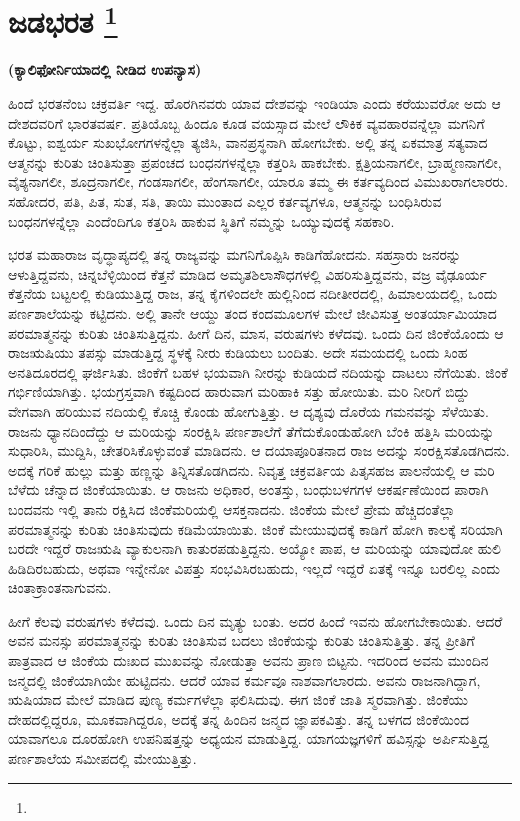 
\chapter[ಜಡಭರತ]{ಜಡಭರತ \protect\footnote{}}

\centerline{\textbf{(ಕ್ಯಾಲಿಫೋರ್ನಿಯಾದಲ್ಲಿ ನೀಡಿದ ಉಪನ್ಯಾಸ)}}

ಹಿಂದೆ ಭರತನೆಂಬ ಚಕ್ರವರ್ತಿ ಇದ್ದ. ಹೊರಗಿನವರು ಯಾವ ದೇಶವನ್ನು ಇಂಡಿಯಾ ಎಂದು ಕರೆಯುವರೋ ಅದು ಆ ದೇಶದವರಿಗೆ ಭಾರತವರ್ಷ. ಪ್ರತಿಯೊಬ್ಬ ಹಿಂದೂ ಕೂಡ ವಯಸ್ಸಾದ ಮೇಲೆ ಲೌಕಿಕ ವ್ಯವಹಾರವನ್ನೆಲ್ಲಾ ಮಗನಿಗೆ ಕೊಟ್ಟು, ಐಶ್ವರ್ಯ ಸುಖಭೋಗಗಳನ್ನೆಲ್ಲಾ ತ್ಯಜಿಸಿ, ವಾನಪ್ರಸ್ಥನಾಗಿ ಹೋಗಬೇಕು. ಅಲ್ಲಿ ತನ್ನ ಏಕಮಾತ್ರ ಸತ್ಯವಾದ ಆತ್ಮನನ್ನು ಕುರಿತು ಚಿಂತಿಸುತ್ತಾ ಪ್ರಪಂಚದ ಬಂಧನಗಳನ್ನೆಲ್ಲಾ ಕತ್ತರಿಸಿ ಹಾಕಬೇಕು. ಕ್ಷತ್ರಿಯನಾಗಲೀ, ಬ್ರಾಹ್ಮಣನಾಗಲೀ, ವೈಶ್ಯನಾಗಲೀ, ಶೂದ್ರನಾಗಲೀ, ಗಂಡಸಾಗಲೀ, ಹೆಂಗಸಾಗಲೀ, ಯಾರೂ ತಮ್ಮ ಈ ಕರ್ತವ್ಯದಿಂದ ವಿಮುಖರಾಗಲಾರರು. ಸಹೋದರ, ಪತಿ, ಪಿತ, ಸುತ, ಸತಿ, ತಾಯಿ ಮುಂತಾದ ಎಲ್ಲರ ಕರ್ತವ್ಯಗಳೂ, ಆತ್ಮನನ್ನು ಬಂಧಿಸಿರುವ ಬಂಧನಗಳನ್ನೆಲ್ಲಾ ಎಂದೆಂದಿಗೂ ಕತ್ತರಿಸಿ ಹಾಕುವ ಸ್ಥಿತಿಗೆ ನಮ್ಮನ್ನು ಒಯ್ಯುವುದಕ್ಕೆ ಸಹಕಾರಿ.

ಭರತ ಮಹಾರಾಜ ವೃದ್ಧಾಪ್ಯದಲ್ಲಿ ತನ್ನ ರಾಜ್ಯವನ್ನು ಮಗನಿಗೊಪ್ಪಿಸಿ ಕಾಡಿಗೆ\break ಹೋದನು. ಸಹಸ್ರಾರು ಜನರನ್ನು ಆಳುತ್ತಿದ್ದವನು, ಚಿನ್ನಬೆಳ್ಳಿಯಿಂದ ಕೆತ್ತನೆ ಮಾಡಿದ ಅಮೃತಶಿಲಾಸೌಧಗಳಲ್ಲಿ ವಿಹರಿಸುತ್ತಿದ್ದವನು, ವಜ್ರ ವೈಢೂರ್ಯ ಕೆತ್ತನೆಯ ಬಟ್ಟಲಲ್ಲಿ ಕುಡಿಯುತ್ತಿದ್ದ ರಾಜ, ತನ್ನ ಕೈಗಳಿಂದಲೇ ಹುಲ್ಲಿನಿಂದ ನದೀತೀರದಲ್ಲಿ, ಹಿಮಾಲಯದಲ್ಲಿ, ಒಂದು ಪರ್ಣಶಾಲೆಯನ್ನು ಕಟ್ಟಿದನು. ಅಲ್ಲಿ ತಾನೇ ಆಯ್ದು ತಂದ ಕಂದಮೂಲಗಳ ಮೇಲೆ ಜೀವಿಸುತ್ತ ಅಂತರ್ಯಾಮಿಯಾದ ಪರಮಾತ್ಮನನ್ನು ಕುರಿತು ಚಿಂತಿಸುತ್ತಿದ್ದನು. ಹೀಗೆ ದಿನ, ಮಾಸ, ವರುಷಗಳು ಕಳೆದವು. ಒಂದು ದಿನ ಜಿಂಕೆಯೊಂದು ಆ ರಾಜಋಷಿಯು ತಪಸ್ಸು ಮಾಡುತ್ತಿದ್ದ ಸ್ಥಳಕ್ಕೆ ನೀರು ಕುಡಿಯಲು ಬಂದಿತು. ಅದೇ ಸಮಯದಲ್ಲಿ ಒಂದು ಸಿಂಹ ಅನತಿದೂರದಲ್ಲಿ ಘರ್ಜಿಸಿತು. ಜಿಂಕೆಗೆ ಬಹಳ ಭಯವಾಗಿ ನೀರನ್ನು ಕುಡಿಯದೆ ನದಿಯನ್ನು ದಾಟಲು ನೆಗೆಯಿತು. ಜಿಂಕೆ ಗರ್ಭಿಣಿಯಾಗಿತ್ತು. ಭಯಗ್ರಸ್ತವಾಗಿ ಕಷ್ಟದಿಂದ ಹಾರುವಾಗ ಮರಿಹಾಕಿ ಸತ್ತು ಹೋಯಿತು. ಮರಿ ನೀರಿಗೆ ಬಿದ್ದು ವೇಗವಾಗಿ ಹರಿಯುವ ನದಿಯಲ್ಲಿ ಕೊಚ್ಚಿ ಕೊಂಡು ಹೋಗುತ್ತಿತ್ತು. ಆ ದೃಶ್ಯವು ದೊರೆಯ ಗಮನವನ್ನು ಸೆಳೆಯಿತು. ರಾಜನು ಧ್ಯಾನದಿಂದೆದ್ದು ಆ ಮರಿಯನ್ನು ಸಂರಕ್ಷಿಸಿ ಪರ್ಣಶಾಲೆಗೆ ತೆಗೆದುಕೊಂಡುಹೋಗಿ ಬೆಂಕಿ ಹತ್ತಿಸಿ ಮರಿಯನ್ನು ಸುಧಾರಿಸಿ, ಮುದ್ದಿಸಿ, ಚೇತರಿಸಿಕೊಳ್ಳುವಂತೆ ಮಾಡಿದನು. ಆ ದಯಾಪೂರಿತನಾದ ರಾಜ ಅದನ್ನು ಸಂರಕ್ಷಿಸತೊಡಗಿದನು. ಅದಕ್ಕೆ ಗರಿಕೆ ಹುಲ್ಲು ಮತ್ತು ಹಣ್ಣನ್ನು ತಿನ್ನಿಸತೊಡಗಿದನು. ನಿವೃತ್ತ ಚಕ್ರವರ್ತಿಯ ಪಿತೃಸಹಜ ಪಾಲನೆಯಲ್ಲಿ ಆ ಮರಿ ಬೆಳೆದು ಚೆನ್ನಾದ ಜಿಂಕೆಯಾಯಿತು. ಆ ರಾಜನು ಅಧಿಕಾರ, ಅಂತಸ್ತು, ಬಂಧುಬಳಗಗಳ ಆಕರ್ಷಣೆಯಿಂದ ಪಾರಾಗಿ ಬಂದವನು ಇಲ್ಲಿ ತಾನು ರಕ್ಷಿಸಿದ ಜಿಂಕೆಮರಿಯಲ್ಲಿ ಆಸಕ್ತನಾದನು. ಜಿಂಕೆಯ ಮೇಲೆ ಪ್ರೇಮ ಹೆಚ್ಚಿದಂತೆಲ್ಲಾ ಪರಮಾತ್ಮನನ್ನು ಕುರಿತು ಚಿಂತಿಸುವುದು ಕಡಿಮೆಯಾಯಿತು. ಜಿಂಕೆ ಮೇಯುವುದಕ್ಕೆ ಕಾಡಿಗೆ ಹೋಗಿ ಕಾಲಕ್ಕೆ ಸರಿಯಾಗಿ ಬರದೇ ಇದ್ದರೆ ರಾಜಋಷಿ ವ್ಯಾಕುಲನಾಗಿ ಕಾತುರಪಡುತ್ತಿದ್ದನು. ಅಯ್ಯೋ ಪಾಪ, ಆ ಮರಿಯನ್ನು ಯಾವುದೋ ಹುಲಿ ಹಿಡಿದಿರಬಹುದು, ಅಥವಾ ಇನ್ನೇನೋ ವಿಪತ್ತು ಸಂಭವಿಸಿರಬಹುದು, ಇಲ್ಲದೆ ಇದ್ದರೆ ಏತಕ್ಕೆ ಇನ್ನೂ ಬರಲಿಲ್ಲ ಎಂದು ಚಿಂತಾಕ್ರಾಂತನಾಗುವನು.

ಹೀಗೆ ಕೆಲವು ವರುಷಗಳು ಕಳೆದವು. ಒಂದು ದಿನ ಮೃತ್ಯು ಬಂತು. ಅದರ ಹಿಂದೆ ಇವನು ಹೋಗಬೇಕಾಯಿತು. ಆದರೆ ಅವನ ಮನಸ್ಸು ಪರಮಾತ್ಮನನ್ನು ಕುರಿತು ಚಿಂತಿಸುವ ಬದಲು ಜಿಂಕೆಯನ್ನು ಕುರಿತು ಚಿಂತಿಸುತ್ತಿತ್ತು. ತನ್ನ ಪ್ರೀತಿಗೆ ಪಾತ್ರವಾದ ಆ ಜಿಂಕೆಯ ದುಃಖದ ಮುಖವನ್ನು ನೋಡುತ್ತಾ ಅವನು ಪ್ರಾಣ ಬಿಟ್ಟನು. ಇದರಿಂದ ಅವನು ಮುಂದಿನ ಜನ್ಮದಲ್ಲಿ ಜಿಂಕೆಯಾಗಿಯೇ ಹುಟ್ಟಿದನು. ಆದರೆ ಯಾವ ಕರ್ಮವೂ ನಾಶವಾಗಲಾರದು. ಅವನು ರಾಜನಾಗಿದ್ದಾಗ, ಋಷಿಯಾದ ಮೇಲೆ ಮಾಡಿದ ಪುಣ್ಯ ಕರ್ಮಗಳೆಲ್ಲಾ ಫಲಿಸಿದುವು. ಈಗ ಜಿಂಕೆ ಜಾತಿ ಸ್ಮರವಾಗಿತ್ತು. ಜಿಂಕೆಯು ದೇಹದಲ್ಲಿದ್ದರೂ, ಮೂಕವಾಗಿದ್ದರೂ, ಅದಕ್ಕೆ ತನ್ನ ಹಿಂದಿನ ಜನ್ಮದ ಜ್ಞಾಪಕವಿತ್ತು. ತನ್ನ ಬಳಗದ ಜಿಂಕೆಯಿಂದ ಯಾವಾಗಲೂ ದೂರಹೋಗಿ ಉಪನಿಷತ್ತನ್ನು ಅಧ್ಯಯನ ಮಾಡುತ್ತಿದ್ದ. ಯಾಗಯಜ್ಞಗಳಿಗೆ ಹವಿಸ್ಸನ್ನು ಅರ್ಪಿಸುತ್ತಿದ್ದ ಪರ್ಣಶಾಲೆಯ ಸಮೀಪದಲ್ಲಿ ಮೇಯುತ್ತಿತ್ತು.

